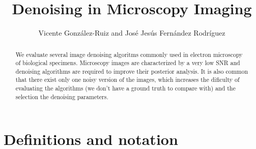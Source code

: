 \documentclass{article}
\title{Denoising in Microscopy Imaging}
\author{Vicente González-Ruiz and José Jesús Fernández Rodríguez}
\begin{document}
\maketitle

\begin{abstract}

  We evaluate several image denoising algoritms commonly used in
  electron microscopy of biological specimens. Microscopy images are
  characterized by a very low SNR and denoising algorithms are
  required to improve their posterior analysis. It is also common that
  there exist only one noisy version of the images, which increases
  the dificulty of evaluating the algorithms (we don't have a ground
  truth to compare with) and the selection the denoising parameters.

\end{abstract}

\tableofcontents

\section*{Definitions and notation}
\end{document}
